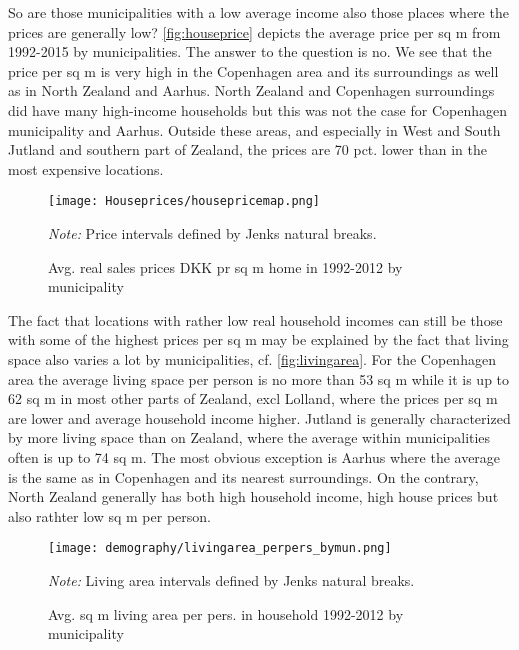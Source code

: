 So are those municipalities with a low average income also those places where the prices are generally low? \autoref{fig:houseprice} depicts the average price per sq m from 1992-2015 by municipalities. The answer to the question is no. We see that the price per sq m is very high in the Copenhagen area and its surroundings as well as in North Zealand and Aarhus. North Zealand and Copenhagen surroundings did have many high-income households but this was not the case for Copenhagen municipality and Aarhus. Outside these areas, and especially in West and South Jutland and southern part of Zealand, the prices are 70 pct. lower than in the most expensive locations. 
\begin{figure}[!htb]
\centering
\label{fig:popdens}
\begin{minipage}{0.8\textwidth}
\texttt{[image: Houseprices/housepricemap.png]}
{\tiny \emph{Note:} Price intervals defined by Jenks natural breaks. \par}
\end{minipage}
\caption{Avg. real sales prices DKK pr sq m home in 1992-2012 by municipality}
\label{fig:houseprice}
\end{figure}

The fact that locations with rather low real household incomes can still be those with some of the highest prices per sq m may be explained by the fact that living space also varies a lot by municipalities, cf. \autoref{fig:livingarea}. For the Copenhagen area the average living space per person is no more than 53 sq m while it is up to 62 sq m in most other parts of Zealand, excl Lolland, where the prices per sq m are lower and average household income higher. Jutland is generally characterized by more living space than on Zealand, where the average within municipalities often is up to 74 sq m. The most obvious exception is Aarhus where the average is the same as in Copenhagen and its nearest surroundings. On the contrary, North Zealand generally has both high household income, high house prices but also rathter low sq m per person.  
\begin{figure}[!htb]
\centering
\label{fig:popdens}
\begin{minipage}{0.8\textwidth}
\texttt{[image: demography/livingarea\_perpers\_bymun.png]}
{\tiny \emph{Note:} Living area intervals defined by Jenks natural breaks. \par}
\end{minipage}
\caption{Avg. sq m living area per pers. in household 1992-2012 by municipality}
\label{fig:livingarea}
\end{figure}


